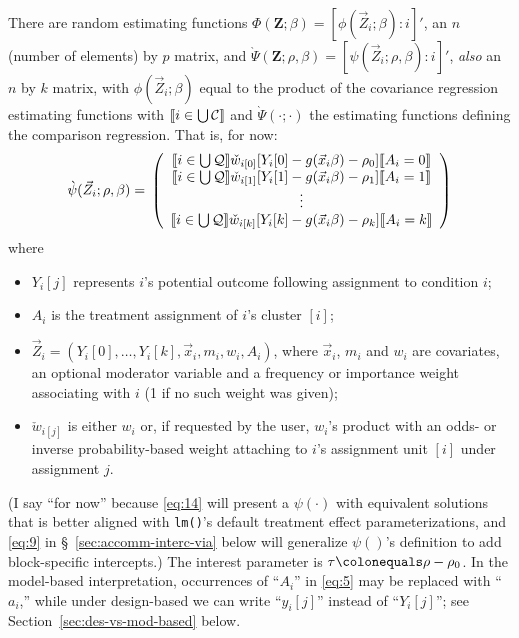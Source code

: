 \documentclass{article}
\newcommand{\defeq}{\ensuremath{\colonequals}}
\DeclarePairedDelimiter{\indicator}{\llbracket}{\rrbracket}
\newcommand{\owt}[1][{[a_i]}]{\ensuremath{\check{w}_{i#1}}}
\begin{document}
There are random estimating functions $\Phi(\mathbf{Z}; \beta ) =
[\phi(\vec{Z}_{i};
\beta) : i]'$, an $n$ (number of elements) by $p$ matrix,  and 
       $\grave{\Psi}(\mathbf{Z}; \rho, \beta) = [\psi(\vec{Z}_{i};
       \rho, \beta): i]'$, \textit{also} an $n$ by $k$ matrix, with 
       $\phi(\vec{Z}_{i}; \beta)$ equal to the product of the covariance
       regression estimating functions with $\indicator{i \in \bigcup \mathcal{C}}$
       and $\grave{\Psi}(\cdot; \cdot)$ the estimating functions defining the comparison regression.  That is, for now:
\begin{equation}
         \label{eq:5}
         \grave{\psi}(\vec{Z}_{i}; \rho, \beta) =\\
         \left( \begin{array}{c}
           \indicator{i \in \bigcup \mathcal{Q}}\owt[{[0]}] [Y_{i}[0] - g(\vec{x}_{i}\beta)-
                  \rho_{0}]\indicator{A_{i}=0}\\
           \indicator{i \in \bigcup \mathcal{Q}}\owt[{[1]}] [Y_{i}[1] - g(\vec{x}_{i}\beta)-
                  \rho_{1}]\indicator{A_{i}=1}\\
                  \vdots \\
           \indicator{i \in \bigcup \mathcal{Q}}\owt[{[k]}] [Y_{i}[k] - g(\vec{x}_{i}\beta)-
                  \rho_{k}]\indicator{A_{i}=k}\\
                \end{array}\right)
\end{equation}
where
\begin{itemize}
\item $Y_{i}[j]$ represents $i$'s potential outcome following
  assignment to condition $i$;
\item $A_{i}$ is the treatment assignment of $i$'s cluster $[i]$;
\item $\vec{Z}_{i} = (Y_{i}[0],\ldots, Y_{i}[k], \vec{x}_{i}, m_{i}, w_{i}, A_{i})$, where $\vec{x}_{i}$, $m_{i}$ and $w_{i}$ are covariates, an optional moderator variable and a
  frequency or importance weight associating with $i$ (1 if no such weight was
  given); 
\item $\owt[{[j]}]$ is either $w_i$ or, 
   if requested by the user, $w_{i}$'s product with an
  odds- or inverse probability-based weight attaching to $i$'s
  assignment unit $[i]$ under assignment $j$.
\end{itemize}
(I say ``for now'' because \eqref{eq:14} will present a
$\psi(\cdot)$ with equivalent solutions that is better aligned with
\texttt{lm()}'s default treatment effect parameterizations, and
\eqref{eq:9} in \S~\ref{sec:accomm-interc-via} below will generalize $\psi()$'s definition
to add block-specific intercepts.)
The interest parameter is $\tau \defeq \rho - \rho_{0}$. In the model-based interpretation, occurrences of ``$A_{i}$'' in \eqref{eq:5} may be replaced with ``$a_{i}$,'' while under design-based we can write ``$y_{i}[j]$'' instead of ``$Y_{i}[j]$''; see Section~\ref{sec:des-vs-mod-based} below.
\end{document}

